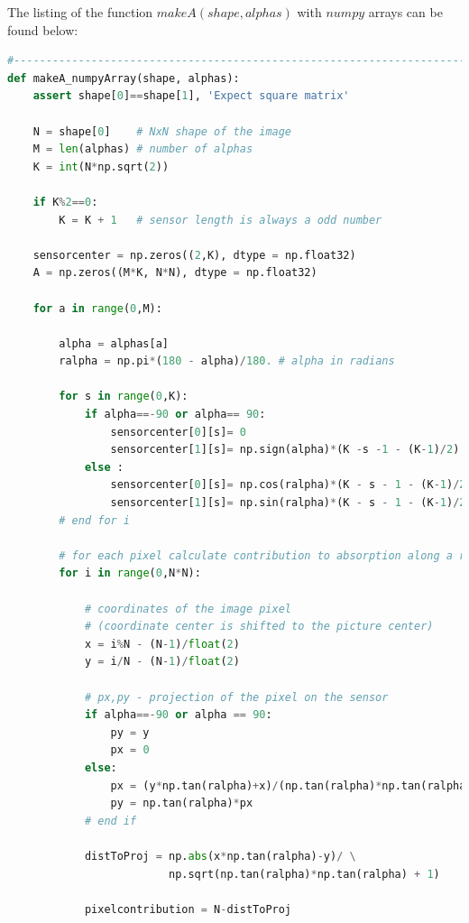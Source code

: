 \documentclass{article}
\begin{document}
The listing of the function $makeA(shape, alphas)$ with $numpy$ arrays can be found below:

\begin{lstlisting}[language=Python]
#-----------------------------------------------------------------------------
def makeA_numpyArray(shape, alphas):
    assert shape[0]==shape[1], 'Expect square matrix'
    
    N = shape[0]    # NxN shape of the image
    M = len(alphas) # number of alphas
    K = int(N*np.sqrt(2))
    
    if K%2==0:
        K = K + 1   # sensor length is always a odd number
    
    sensorcenter = np.zeros((2,K), dtype = np.float32)
    A = np.zeros((M*K, N*N), dtype = np.float32)    
    
    for a in range(0,M):
        
        alpha = alphas[a]
        ralpha = np.pi*(180 - alpha)/180. # alpha in radians
                        
        for s in range(0,K):
            if alpha==-90 or alpha== 90:
                sensorcenter[0][s]= 0
                sensorcenter[1][s]= np.sign(alpha)*(K -s -1 - (K-1)/2) 
            else :                 
                sensorcenter[0][s]= np.cos(ralpha)*(K - s - 1 - (K-1)/2 ) 
                sensorcenter[1][s]= np.sin(ralpha)*(K - s - 1 - (K-1)/2 ) 
        # end for i
                
        # for each pixel calculate contribution to absorption along a rai
        for i in range(0,N*N):
                            
            # coordinates of the image pixel
            # (coordinate center is shifted to the picture center)
            x = i%N - (N-1)/float(2)
            y = i/N - (N-1)/float(2)
            
            # px,py - projection of the pixel on the sensor 
            if alpha==-90 or alpha == 90:           
                py = y
                px = 0                    
            else:
                px = (y*np.tan(ralpha)+x)/(np.tan(ralpha)*np.tan(ralpha)+1)
                py = np.tan(ralpha)*px
            # end if
            
            distToProj = np.abs(x*np.tan(ralpha)-y)/ \
                         np.sqrt(np.tan(ralpha)*np.tan(ralpha) + 1)
                         
            pixelcontribution = N-distToProj
            

\end{lstlisting}
\end{document}
